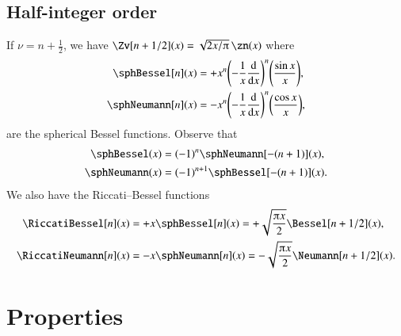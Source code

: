     \subsection{Half-integer order}
        If $\nu=n+\frac{1}{2}$, we have $\Zv[n+1/2](x) = \sqrt{2x/\ppi}\, \zn(x)$ where
        \begin{subequations}
            \begin{align}
                \sphBessel[n](x) &= +x^n \pclosed{-\frac{1}{x} \dv{}{x}}^n \pclosed{ \frac{\sin{x}}{x}}  ,\\
                \sphNeumann[n](x) &= - x^n \pclosed{-\frac{1}{x} \dv{}{x}}^n \pclosed{ \frac{\cos{x}}{x}},
            \end{align}
        \end{subequations}
        are the spherical Bessel functions. %
        Observe that 
        \begin{subequations}
            \begin{align}
                \sphBessel(x) &= (-1)^n \sphNeumann[-(n+1)](x), \\
                \sphNeumann(x) &= (-1)^{n+1} \sphBessel[-(n+1)](x). \\
            \end{align}
        \end{subequations}
        We also have the Riccati--Bessel functions
        \begin{subequations}\label{eq:cylinder:Riccati_Bessel}
            \begin{align}
                \RiccatiBessel[n](x) &= +x\sphBessel[n](x) = +\sqrt{\frac{\ppi x}{2}} \Bessel[n+1/2](x),\\
                \RiccatiNeumann[n](x) &= -x\sphNeumann[n](x)  = -\sqrt{\frac{\ppi x}{2}} \Neumann[n+1/2](x).
            \end{align}
        \end{subequations}

        







\section{Properties}


